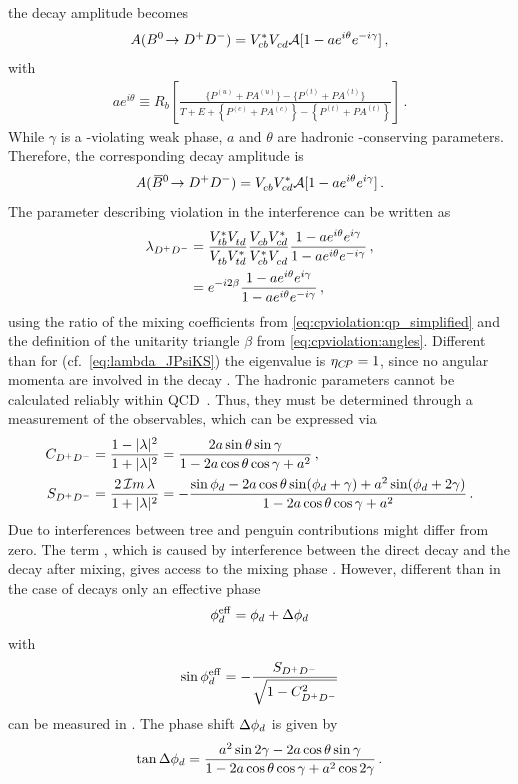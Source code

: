 the decay amplitude becomes
\begin{align}
	A({{B}^0}\!\rightarrow {\ensuremath{{D}^+}}{\ensuremath{{D}^-}}) = {V_{{c}{b}}^\ast}{V_{{c}{d}}^{}} \mathcal{A}[1 - ae^{i\theta}e^{-i\gamma}]\,,
\end{align}
with
\begin{align}
	ae^{i\theta} \equiv R_b\left[\frac{\{P^{(u)} + P\!A^{(u)}\} - \{P^{(t)} + P\!A^{(t)}\}}{T + E + \left\{P^{(c)} + P\!A^{(c)}\right\} - \left\{P^{(t)} + P\!A^{(t)}\right\}}\right]\,.
\end{align}
While $\gamma$ is a \CP-violating weak phase, $a$ and $\theta$ are hadronic
\CP-conserving parameters. Therefore, the corresponding \Bzb decay amplitude
is
\begin{align}
	A({{\kern 0.18em\overline{\kern -0.18em B}{}}{}^0}\!\rightarrow {\ensuremath{{D}^+}}{\ensuremath{{D}^-}}) = {V_{{c}{b}}^{}}{V_{{c}{d}}^\ast} \mathcal{A}[1 - ae^{i\theta}e^{i\gamma}]\,.
\end{align}
The parameter describing \CP violation in the interference can be written as
\begin{align}
\begin{split}
	\lambda_{{{D}^+}{{D}^-}} &= \frac{{V_{{t}{b}}^\ast}{V_{{t}{d}}^{}}}{{V_{{t}{b}}^{}}{V_{{t}{d}}^\ast}}\frac{{V_{{c}{b}}^{}}{V_{{c}{d}}^\ast}}{{V_{{c}{b}}^\ast}{V_{{c}{d}}^{}}}\frac{1-ae^{i\theta}e^{i\gamma}}{1-ae^{i\theta}e^{-i\gamma}}\,,\\
					 &= e^{-i2\beta}\frac{1-ae^{i\theta}e^{i\gamma}}{1-ae^{i\theta}e^{-i\gamma}}\,,
\end{split}
\end{align}
using the ratio of the mixing coefficients from
\cref{eq:cpviolation:qp_simplified} and the definition of the unitarity
triangle $\beta$ from \cref{eq:cpviolation:angles}. Different than for
\BdToJPsiKS (cf.~\cref{eq:lambda_JPsiKS}) the \CP eigenvalue is $\eta_{{C\!P}} =
\num{+1}$, since no angular momenta are involved in the decay \BdToDD. The
hadronic parameters cannot be calculated reliably within
QCD~\cite{Bel:2015wha}. Thus, they must be determined through a measurement of
the \CP observables, which can be expressed via
\begin{align}
	C_{{{D}^+}{{D}^-}} &= \frac{1 - |\lambda|^2}{1 + |\lambda|^2} = \frac{2a\sin\theta\sin\gamma}{1 - 2a\cos\theta\cos\gamma + a^2}\,,\\
	S_{{{D}^+}{{D}^-}} &= \frac{2\,\mathcal{I}m\,\lambda}{1 + |\lambda|^2} = -\frac{\sin{\ensuremath{\phi_{{d}}}} - 2a \cos\theta\sin({\phi_{{d}}} + \gamma) + a^2\sin({\phi_{{d}}} + 2\gamma)}{1 - 2a\cos\theta\cos\gamma + a^2}\,.
\end{align}
Due to interferences between tree and penguin contributions \CDD might differ
from zero. The term \SDD, which is caused by interference between the direct
decay and the decay after mixing, gives access to the mixing phase \phid.
However, different than in the case of \BdToJPsiKS decays only an effective
phase
\begin{align}
	\phi_{{d}}^{\mathrm{eff}} = {\phi_{{d}}} + \Delta{\ensuremath{\phi_{{d}}}}
\end{align}
with
\begin{align}
	\sin\phi_{{d}}^{\mathrm{eff}} = -\frac{S_{{{D}^+}{{D}^-}}}{\sqrt{1 - C_{{{D}^+}{{D}^-}}^2}}
\end{align}
can be measured in \BdToDD. The phase shift $\Delta{\ensuremath{\phi_{{d}}}}$ is given by
\begin{align}
	\tan\Delta{\ensuremath{\phi_{{d}}}} = \frac{a^2\sin2\gamma - 2a\cos\theta\sin\gamma}{1 - 2a\cos\theta\cos\gamma + a^2\cos2\gamma}\,.
\end{align}

